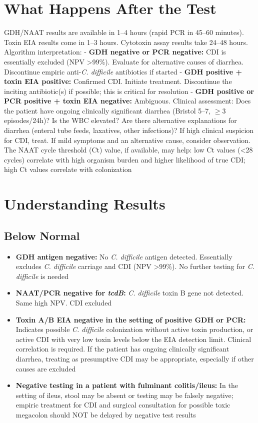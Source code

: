 \section*{What Happens After the Test}
GDH/NAAT results are available in 1--4 hours (rapid PCR in 45--60 minutes). Toxin EIA results come in 1--3 hours. Cytotoxin assay results take 24--48 hours. Algorithm interpretation:
  - \textbf{GDH negative or PCR negative:} CDI is essentially excluded (NPV >99\%). Evaluate for alternative causes of diarrhea. Discontinue empiric anti-\textit{C. difficile} antibiotics if started
  - \textbf{GDH positive + toxin EIA positive:} Confirmed CDI. Initiate treatment. Discontinue the inciting antibiotic(s) if possible; this is critical for resolution
  - \textbf{GDH positive or PCR positive + toxin EIA negative:} Ambiguous. Clinical assessment: Does the patient have ongoing clinically significant diarrhea (Bristol 5--7, $\geq$3 episodes/24h)? Is the WBC elevated? Are there alternative explanations for diarrhea (enteral tube feeds, laxatives, other infections)? If high clinical suspicion for CDI, treat. If mild symptoms and an alternative cause, consider observation. The NAAT cycle threshold (Ct) value, if available, may help: low Ct values (<28 cycles) correlate with high organism burden and higher likelihood of true CDI; high Ct values correlate with colonization

\section*{Understanding Results}

\subsection*{Below Normal}
\begin{itemize}
  \item \textbf{GDH antigen negative:} No \textit{C. difficile} antigen detected. Essentially excludes \textit{C. difficile} carriage and CDI (NPV >99\%). No further testing for \textit{C. difficile} is needed
  \item \textbf{NAAT/PCR negative for \textit{tcdB}:} \textit{C. difficile} toxin B gene not detected. Same high NPV. CDI excluded
  \item \textbf{Toxin A/B EIA negative in the setting of positive GDH or PCR:} Indicates possible \textit{C. difficile} colonization without active toxin production, or active CDI with very low toxin levels below the EIA detection limit. Clinical correlation is required. If the patient has ongoing clinically significant diarrhea, treating as presumptive CDI may be appropriate, especially if other causes are excluded
  \item \textbf{Negative testing in a patient with fulminant colitis/ileus:} In the setting of ileus, stool may be absent or testing may be falsely negative; empiric treatment for CDI and surgical consultation for possible toxic megacolon should NOT be delayed by negative test results
\end{itemize}


